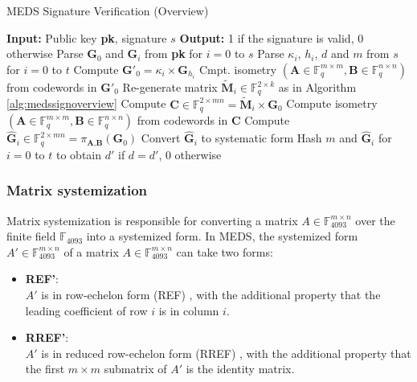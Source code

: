 \documentclass[11pt,a4paper]{report}
\theoremstyle{definition}
\begin{document}
\begin{algorithm}
  \caption{MEDS Signature Verification (Overview)}
  \label{alg:medsverifyoverview}
  \begin{algorithmic}[1]
    \State \textbf{Input:} Public key \textbf{pk}, signature $s$
    \State \textbf{Output:} 1 if the signature is valid, 0 otherwise
    \State Parse $\textbf{G}_0$ and $\textbf{G}_i$ from \textbf{pk} for $i = 0$ to $s$
    \State Parse $\kappa_i$, $h_i$, $d$ and $m$ from $s$ for $i = 0$ to $t$
        \State Compute $\textbf{G}'_{0} = \kappa_i \times \textbf{G}_{h_i}$
        \State Cmpt. isometry $(\textbf{A} \in \mathbb{F}_q^{m \times m}, \textbf{B} \in \mathbb{F}_q^{n \times n})$ from codewords in $\textbf{G}'_{0}$
      \Else
        \State Re-generate matrix $\tilde{\textbf{M}}_i \in \mathbb{F}_q^{2 \times k}$ as in Algorithm \ref{alg:medssignoverview}
        \State Compute $\textbf{C} \in \mathbb{F}_q^{2 \times mn} = \tilde{\textbf{M}}_i \times \textbf{G}_0$
        \State Compute isometry $(\textbf{A} \in \mathbb{F}_q^{m \times m}, \textbf{B} \in \mathbb{F}_q^{n \times n})$ from codewords in $\textbf{C}$
      \EndIf
      \State Compute $\hat{\textbf{G}}_i \in \mathbb{F}_q^{2 \times mn} = \pi_{\textbf{A}, \textbf{B}}(\textbf{G}_0)$
      \State Convert $\hat{\textbf{G}}_i$ to systematic form
    \EndFor
    \State Hash $m$ and $\hat{\textbf{G}}_i$ for $i = 0$ to $t$ to obtain $d'$
    \State {} if $d = d'$, 0 otherwise
  \end{algorithmic}
\end{algorithm}

\subsubsection{Matrix systemization}
\label{sec:systemization}
Matrix systemization is responsible for converting a matrix $A \in \mathbb{F}_{4093}^{m \times n}$ over the finite field $\mathbb{F}_{4093}$ into a systemized form. In MEDS, the systemized form $A' \in \mathbb{F}_{4093}^{m \times n}$ of a matrix $A \in \mathbb{F}_{4093}^{m \times n}$ can take two forms:
\begin{itemize}
  \item \textbf{REF'}:\\
  $A'$ is in row-echelon form (REF) \cite{leon2006linear}, with the additional property that the leading coefficient of row $i$ is in column $i$.
  \item \textbf{RREF'}:\\
  $A'$ is in reduced row-echelon form (RREF) \cite{leon2006linear}, with the additional property that the first $m \times m$ submatrix of $A'$ is the identity matrix.
\end{itemize}
\end{document}
